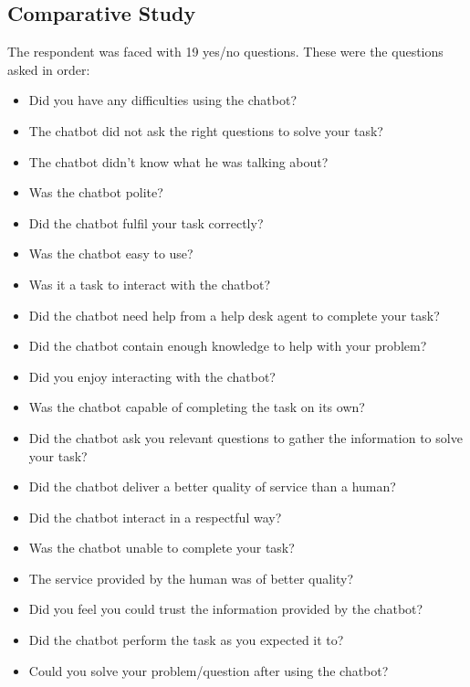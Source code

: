 \begin{appendices}
	\subsection{Comparative Study}
	The respondent was faced with 19 yes/no questions. These were the questions asked in order:
	\begin{itemize}
		\item Did you have any difficulties using the chatbot?
		\item The chatbot did not ask the right questions to solve your task?
		\item The chatbot didn't know what he was talking about?
		\item Was the chatbot polite?
		\item Did the chatbot fulfil your task correctly?
		\item Was the chatbot easy to use?
		\item Was it a task to interact with the chatbot?
		\item Did the chatbot need help from a help desk agent to complete your task?
		\item Did the chatbot contain enough knowledge to help with your problem?
		\item Did you enjoy interacting with the chatbot?
		\item Was the chatbot capable of completing the task on its own?
		\item Did the chatbot ask you relevant questions to gather the information to solve your task?
		\item Did the chatbot deliver a better quality of service than a human?
		\item Did the chatbot interact in a respectful way?
		\item Was the chatbot unable to complete your task?
		\item The service provided by the human was of better quality?
		\item Did you feel you could trust the information provided by the chatbot?
		\item Did the chatbot perform the task as you expected it to?
		\item Could you solve your problem/question after using the chatbot?
	\end{itemize}
	

\end{appendices}
